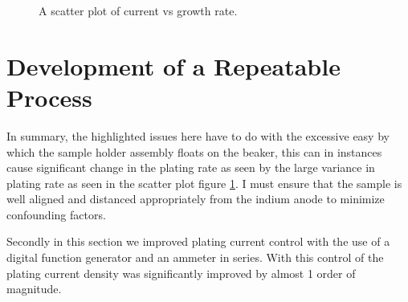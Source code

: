 \begin{figure}
    \centering
    \caption{A scatter plot of current vs growth rate.}
    \label{fig:scatterplot}
\end{figure}



\section{Development of a Repeatable Process}
In summary, the highlighted issues here have to do with the excessive easy by which the sample holder assembly floats on the beaker, this can in instances cause significant change in the plating rate as seen by the large variance in plating rate as seen in the scatter plot figure \ref{fig:scatterplot}. I must ensure that the sample is well aligned and distanced appropriately from the indium anode to minimize confounding factors.

Secondly in this section we improved plating current control with the use of a digital function generator and an ammeter in series. With this control of the plating current density was significantly improved by almost 1 order of magnitude.

